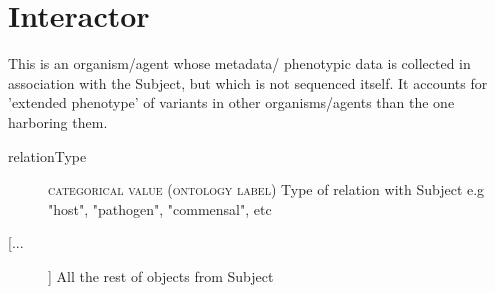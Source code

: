 \documentclass[a4paper, 10pt]{article}        %
\begin{document}
  
 \section*{{\color{teal} Interactor}}
This is an organism/agent whose metadata/ phenotypic data is collected in association with the Subject, but which is not sequenced itself. It accounts for 'extended phenotype' of variants in other organisms/agents than the one harboring them.
\begin{description}
	\item[relationType] {\textsc{categorical value (ontology label)}} Type of relation with Subject e.g "host", "pathogen", "commensal", etc
	\item[[...]] All the rest of objects from Subject
\end{description}
 
 
\end{document}
